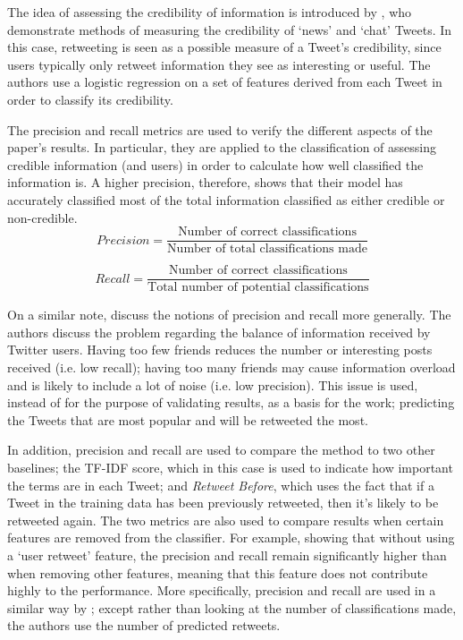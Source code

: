The idea of assessing the credibility of information is introduced by \citet{castillo11}, who demonstrate methods of measuring the credibility of `news' and `chat' Tweets. In this case, retweeting is seen as a possible measure of a Tweet's credibility, since users typically only retweet information they see as interesting or useful. The authors use a logistic regression on a set of features derived from each Tweet in order to classify its credibility. 

The precision and recall metrics are used to verify the different aspects of the paper's results. In particular, they are applied to the classification of assessing credible information (and users) in order to calculate how well classified the information is. A higher precision, therefore, shows that their model has accurately classified most of the total information classified as either credible or non-credible.
\[	
	Precision = \frac{\text{Number of correct classifications}}{\text{Number of total classifications made}}
\]

\[
	Recall = \frac{\text{Number of correct classifications}}{\text{Total number of potential classifications}}
\]

On a similar note, \citet{hong11} discuss the notions of precision and recall more generally. The authors discuss the problem regarding the balance of information received by Twitter users. Having too few friends reduces the number or interesting posts received (i.e. low recall); having too many friends may cause information overload and is likely to include a lot of noise (i.e. low precision). This issue is used, instead of for the purpose of validating results, as a basis for the work; predicting the Tweets that are most popular and will be retweeted the most.

In addition, precision and recall are used to compare the method to two other baselines; the TF-IDF score, which in this case is used to indicate how important the terms are in each Tweet; and \emph{Retweet Before}, which uses the fact that if a Tweet in the training data has been previously retweeted, then it's likely to be retweeted again. The two metrics are also used to compare results when certain features are removed from the classifier. For example, showing that without using a `user retweet' feature, the precision and recall remain significantly higher than when removing other features, meaning that this feature does not contribute highly to the performance. More specifically, precision and recall are used in a similar way by \citet{castillo11}; except rather than looking at the number of classifications made, the authors use the number of predicted retweets.

